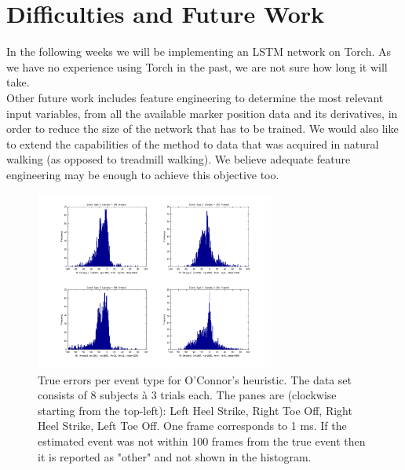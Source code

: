 \documentclass{acm_proc_article-sp}
\begin{document}
\section{Difficulties and Future Work}
In the following weeks we will be implementing an LSTM network on Torch. As we have no experience using Torch in the past, we are not sure how long it will take.\\

Other future work includes feature engineering to determine the most relevant input variables, from all the available marker position data and its derivatives, in order to reduce the size of the network that has to be trained. We would also like to extend the capabilities of the method to data that was acquired in natural walking (as opposed to treadmill walking). We believe adequate feature engineering may be enough to achieve this objective too.\\

\nocite{*}
\printbibliography

\begin{figure}
\begin{center}
\includegraphics[width=0.70\textwidth]{figures/trueErrorsPerEventType_oconner.png}
\end{center}
\caption{
True errors per event type for O'Connor's heuristic. 
The data set consists of 8 subjects à 3 trials each.
The panes are (clockwise starting from the top-left):
Left Heel Strike, Right Toe Off, Right Heel Strike, Left Toe Off.
One frame corresponds to 1 ms.
If the estimated event was not within 100 frames from the true event then it is reported as "other" and not shown in the histogram.
}
\label{fig:oconner}
\end{figure}
\end{document}
